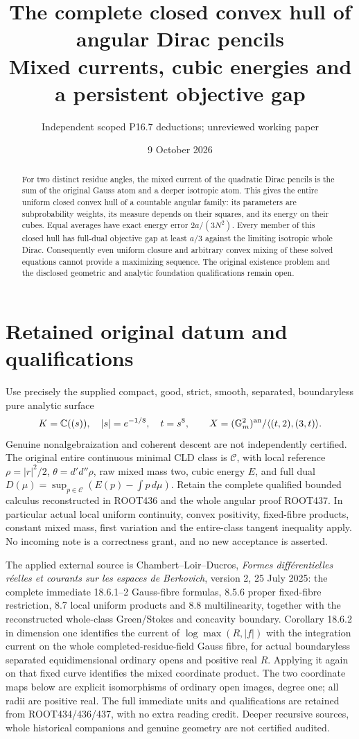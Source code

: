 \documentclass[11pt]{article}
\title{The complete closed convex hull of angular Dirac pencils\\
Mixed currents, cubic energies and a persistent objective gap}
\author{Independent scoped P16.7 deductions; unreviewed working paper}
\date{9 October 2026}
\newcommand{\DD}{d'd''}
\newcommand{\C}{\mathcal C}
\begin{document}
\maketitle
\begin{abstract}
For two distinct residue angles, the mixed current of the quadratic
Dirac pencils is the sum of the original Gauss atom and a deeper isotropic
atom. This gives the entire uniform closed convex hull of a countable
angular family: its parameters are subprobability weights, its measure
depends on their squares, and its energy on their cubes. Equal averages
have exact energy error $2a/(3N^2)$. Every member of this closed hull
has full-dual objective gap at least $a/3$ against the limiting isotropic
whole Dirac. Consequently even uniform closure and arbitrary convex
mixing of these solved equations cannot provide a maximizing sequence.
The original existence problem and the disclosed geometric and analytic
foundation qualifications remain open.
\end{abstract}

\section{Retained original datum and qualifications}
Use precisely the supplied compact, good, strict, smooth, separated,
boundaryless pure analytic surface
\[
 K=\mathbb C((s)),\quad |s|=e^{-1/8},\quad t=s^8,\qquad
 X=(\mathbb G_m^2)^{\rm an}/\langle(t,2),(3,t)\rangle.
\]
Genuine nonalgebraization and coherent descent are not independently
certified. The original entire continuous minimal CLD class is $\C$,
with local reference $\rho=|r|^2/2$, $\theta=\DD\rho$, raw mixed mass two,
cubic energy $E$, and full dual
$D(\mu)=\sup_{p\in\C}(E(p)-\int p\,d\mu)$.
Retain the complete qualified bounded calculus reconstructed in ROOT436
and the whole angular proof ROOT437. In particular actual local uniform
continuity, convex positivity, fixed-fibre products, constant mixed mass,
first variation and the entire-class tangent inequality apply. No incoming
note is a correctness grant, and no new acceptance is asserted.

The applied external source is Chambert--Loir--Ducros,
\emph{Formes diff\'erentielles r\'eelles et courants sur les espaces de
Berkovich}, version 2, 25 July 2025: the complete immediate 18.6.1--2
Gauss-fibre formulas, 8.5.6 proper fixed-fibre restriction, 8.7 local
uniform products and 8.8 multilinearity, together with the reconstructed
whole-class Green/Stokes and concavity boundary. Corollary 18.6.2 in
dimension one identifies the current of $\log\max(R,|f|)$ with the
integration current on the whole completed-residue-field Gauss fibre,
for actual boundaryless separated equidimensional ordinary opens and
positive real $R$. Applying it again on that fixed curve identifies the
mixed coordinate product. The two coordinate maps below are explicit
isomorphisms of ordinary open images, degree one; all radii are positive
real. The full immediate units and qualifications are retained from
ROOT434/436/437, with no extra reading credit. Deeper recursive sources,
whole historical companions and genuine geometry are not certified audited.
\end{document}
